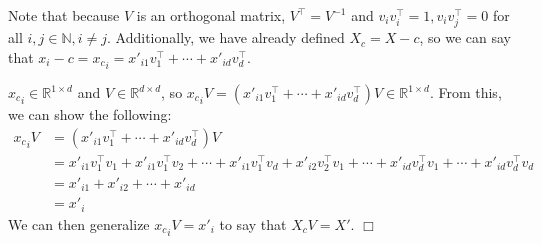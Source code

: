 \documentclass{article}%
\newenvironment{proof}{\noindent{\em Proof:}}{$\Box$~\\}
\begin{document}
\begin{proof}
Note that because $V$ is an orthogonal matrix, $V^\intercal=V^{-1}$ and $v_i v^\intercal_i=1, v_i v^\intercal_j=0$ for all $i,j\in \mathbb{N},i\neq j$. Additionally, we have already defined $X_c=X-c$, so we can say that $x_i-c={x_c}_i=x'_{i1}v^\intercal_1+\cdots+x'_{id}v^\intercal_d$.

${x_c}_i \in \mathbb{R}^{1\times d}$ and $V \in \mathbb{R}^{d \times d}$, so ${x_c}_i V =(x'_{i1}v^\intercal_1+\cdots+x'_{id}v^\intercal_d)V \in \mathbb{R}^{1\times d}$. From this, we can show the following:
\begin{align*}
    {x_c}_i V &= (x'_{i1}v^\intercal_1+\cdots+x'_{id}v^\intercal_d)V\\
    &= x'_{i1}v^\intercal_1v_1+x'_{i1}v^\intercal_1v_2+\cdots+x'_{i1}v^\intercal_1v_d+x'_{i2}v^\intercal_2v_1+\cdots+x'_{id}v^\intercal_dv_1+\cdots+x'_{id}v^\intercal_dv_d\\
    &=x'_{i1}+x'_{i2}+\cdots+x'_{id}\\
    &=x'_i
\end{align*}
We can then generalize ${x_c}_iV=x'_i$ to say that $X_c V = X'$.
\end{proof}
\end{document}

